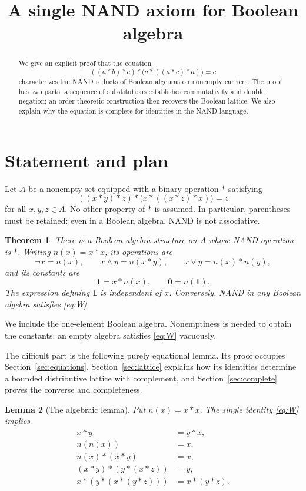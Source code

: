 \documentclass[11pt,a4paper]{article}
\title{A single NAND axiom for Boolean algebra}
\author{}
\date{}
\newtheorem{theorem}{Theorem}
\newtheorem{lemma}[theorem]{Lemma}
\newcommand{\one}{\mathbf{1}}
\newcommand{\zero}{\mathbf{0}}
\begin{document}
\maketitle
\vspace{-2em}
\begin{abstract}
We give an explicit proof that the equation
\[
 ((a*b)*c)*\bigl(a*((a*c)*a)\bigr)=c
\]
characterizes the NAND reducts of Boolean algebras on nonempty carriers.
The proof has two parts: a sequence of substitutions establishes
commutativity and double negation; an order-theoretic construction then
recovers the Boolean lattice. We also explain why the equation is complete
for identities in the NAND language.
\end{abstract}

\section{Statement and plan}
Let $A$ be a nonempty set equipped with a binary operation $*$ satisfying
\begin{equation}
 \boxed{((x*y)*z)*\bigl(x*((x*z)*x)\bigr)=z}
 \tag{W}\label{eq:W}
\end{equation}
for all $x,y,z\in A$. No other property of $*$ is assumed. In particular,
parentheses must be retained: even in a Boolean algebra, NAND is not
associative.

\begin{theorem}\label{thm:main}
There is a Boolean algebra structure on $A$ whose NAND operation is $*$.
Writing $n(x)=x*x$, its operations are
\[
 \neg x=n(x),\qquad
 x\wedge y=n(x*y),\qquad
 x\vee y=n(x)*n(y),
\]
and its constants are
\[
 \one=x*n(x),\qquad \zero=n(\one).
\]
The expression defining $\one$ is independent of $x$. Conversely, NAND
in any Boolean algebra satisfies \eqref{eq:W}.
\end{theorem}

We include the one-element Boolean algebra. Nonemptiness is needed to
obtain the constants: an empty algebra satisfies \eqref{eq:W} vacuously.

The difficult part is the following purely equational lemma. Its proof
occupies Section~\ref{sec:equations}. Section~\ref{sec:lattice} explains
how its identities determine a bounded distributive lattice with
complement, and Section~\ref{sec:complete} proves the converse and
completeness.

\begin{lemma}[The algebraic lemma]\label{lem:core}
Put $n(x)=x*x$. The single identity \eqref{eq:W} implies
\begin{align}
 x*y&=y*x,\tag{C}\label{eq:comm}\\
 n(n(x))&=x,\tag{DN}\label{eq:DN}\\
 n(x)*(x*y)&=x,\tag{I}\label{eq:I}\\
 (x*y)*(y*(x*z))&=y,\tag{S}\label{eq:S}\\
 x*(y*(x*(y*z)))&=x*(y*z).\tag{J}\label{eq:J}
\end{align}
\end{lemma}
\end{document}
